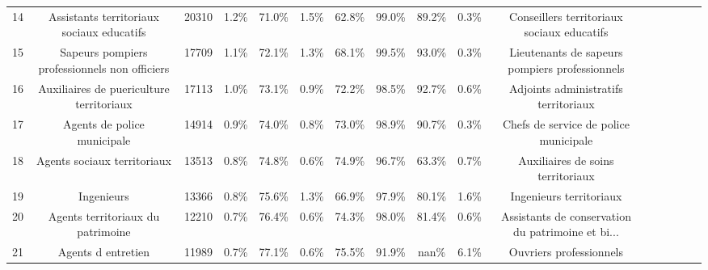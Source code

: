 \documentclass[10pt]{article}
\begin{document}
\begin{landscape}
\begin{longtable}{ | p{0.5cm} |*{15}{c|} }
14  &          Assistants territoriaux sociaux educatifs &          20310 &           1.2\% &                  71.0\% &                 1.5\% &                    62.8\% &              99.0\% &                             89.2\% &                                     0.3\% &         Conseillers territoriaux sociaux educatifs \\
15  &      Sapeurs pompiers professionnels non officiers &          17709 &           1.1\% &                  72.1\% &                 1.3\% &                    68.1\% &              99.5\% &                             93.0\% &                                     0.3\% &     Lieutenants de sapeurs pompiers professionnels \\
16  &           Auxiliaires de puericulture territoriaux &          17113 &           1.0\% &                  73.1\% &                 0.9\% &                    72.2\% &              98.5\% &                             92.7\% &                                     0.6\% &               Adjoints administratifs territoriaux \\
17  &                        Agents de police municipale &          14914 &           0.9\% &                  74.0\% &                 0.8\% &                    73.0\% &              98.9\% &                             90.7\% &                                     0.3\% &              Chefs de service de police municipale \\
18  &                        Agents sociaux territoriaux &          13513 &           0.8\% &                  74.8\% &                 0.6\% &                    74.9\% &              96.7\% &                             63.3\% &                                     0.7\% &                  Auxiliaires de soins territoriaux \\
19  &                                         Ingenieurs &          13366 &           0.8\% &                  75.6\% &                 1.3\% &                    66.9\% &              97.9\% &                             80.1\% &                                     1.6\% &                            Ingenieurs territoriaux \\
20  &                  Agents territoriaux du patrimoine &          12210 &           0.7\% &                  76.4\% &                 0.6\% &                    74.3\% &              98.0\% &                             81.4\% &                                     0.6\% &  Assistants de conservation du patrimoine et bi... \\
21  &                                 Agents d entretien &          11989 &           0.7\% &                  77.1\% &                 0.6\% &                    75.5\% &              91.9\% &                              nan\% &                                     6.1\% &                            Ouvriers professionnels \\

\end{longtable}
\end{landscape}
\end{document}
